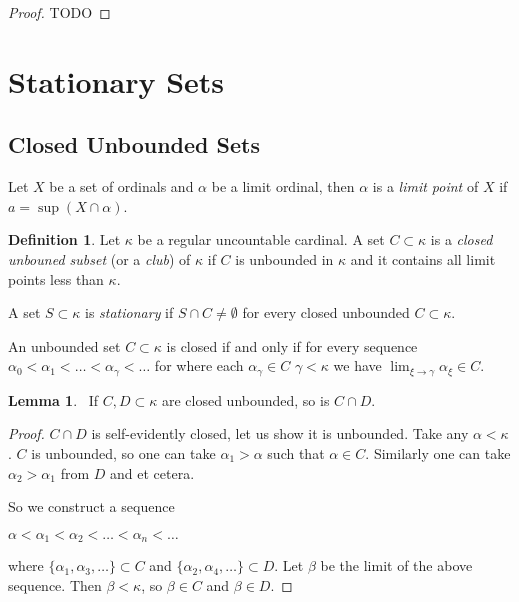 \documentclass[8pt]{article}
\theoremstyle{definition}
\newtheorem{definition}{Definition}[section]
\theoremstyle{definition}
\theoremstyle{definition}
\theoremstyle{definition}
\theoremstyle{definition}
\theoremstyle{definition}
\theoremstyle{definition}
\theoremstyle{definition}
\newtheorem{lemma}{Lemma}[section]
\theoremstyle{definition}
\theoremstyle{definition}
\theoremstyle{definition}
\theoremstyle{definition}
\theoremstyle{definition}
\theoremstyle{definition}
\theoremstyle{question}
\begin{document}
\begin{proof}
  TODO
\end{proof}

\section{Stationary Sets}

\subsection{Closed Unbounded Sets}

Let $X$ be a set of ordinals and $\alpha$ be a limit ordinal, then $\alpha$ is a \emph{limit point} of $X$ if
$a = \sup (X \cap \alpha)$.

\begin{definition}
  Let $\kappa$ be a regular uncountable cardinal. 
  A set $C \subset \kappa$ is a \emph{closed unbouned subset} (or a \emph{club}) of $\kappa$ if $C$ is unbounded in $\kappa$
  and it contains all limit points less than $\kappa$.

  A set $S \subset \kappa$ is \emph{stationary} if $S \cap C \neq \emptyset$ for every closed unbounded $C \subset \kappa$.
\end{definition}

An unbounded set $C \subset \kappa$ is closed if and only if for every sequence 
$\alpha_0 < \alpha_1 < \ldots < \alpha_{\gamma} < \ldots$ for where each $\alpha_{\gamma} \in C$ $\gamma < \kappa$
we have $\lim_{\xi \to \gamma} \alpha_{\xi} \in C$.

\begin{lemma}~\label{club:int}
  If $C, D \subset \kappa$ are closed unbounded, so is $C \cap D$.
\end{lemma}

\begin{proof}
  $C \cap D$ is self-evidently closed, let us show it is unbounded.
  Take any $\alpha < \kappa$. $C$ is unbounded, so one can take $\alpha_1 > \alpha$ such that $\alpha \in C$.
  Similarly one can take $\alpha_2 > \alpha_1$ from $D$ and et cetera.

  So we construct a sequence
  \begin{center}
    $\alpha < \alpha_1 < \alpha_2 < \ldots < \alpha_n < \ldots$
  \end{center}
  where $\{ \alpha_1, \alpha_3, \dots \} \subset C$ and $\{ \alpha_2, \alpha_4, \dots \} \subset D$. Let $\beta$
  be the limit of the above sequence. Then $\beta < \kappa$, so $\beta \in C$ and $\beta \in D$.
\end{proof}
\end{document}
